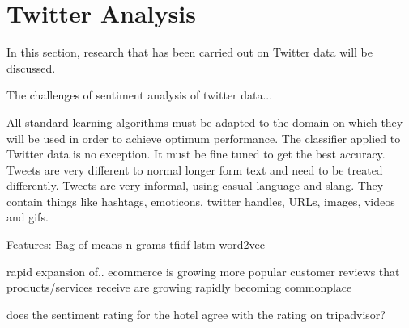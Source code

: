 \section{Twitter Analysis}

In this section, research that has been carried out on Twitter data will be discussed.

The challenges of sentiment analysis of twitter data...

All standard learning algorithms must be adapted to the domain on which they will be used in order to achieve optimum performance. The classifier applied to Twitter data is no exception. It must be fine tuned to get the best accuracy. Tweets are very different to normal longer form text and need to be treated differently. Tweets are very informal, using casual language and slang. They contain things like hashtags, emoticons, twitter handles, URLs, images, videos and gifs.

Features:
Bag of means
n-grams
tfidf
lstm
word2vec

rapid expansion of..
ecommerce is growing more popular
customer reviews that products/services receive are growing rapidly
becoming commonplace

does the sentiment rating for the hotel agree with the rating on tripadvisor?


